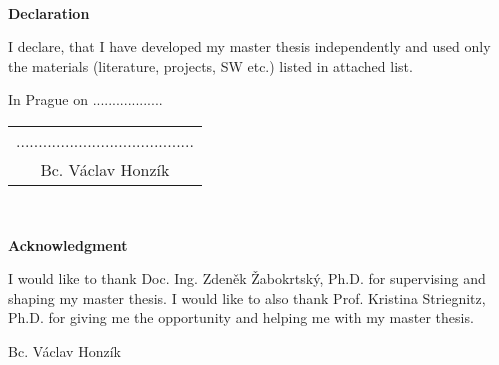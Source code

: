 \documentclass[a4paper,12pt,twoside]{report}
\newcommand{\autor}{Bc. Václav Honzík}           %
\newcommand{\vedouci}{Doc. Ing. Zdeněk Žabokrtský, Ph.D.}         %
\newcommand{\konzultant}{Prof. Kristina Striegnitz, Ph.D.} %
\begin{document}
~ %
\vfill %

{\bf Declaration} %

\vspace{0.5cm} %
I declare, that I have developed my master thesis independently and used only the materials (literature, projects, SW etc.) listed in attached list.

\vspace{5mm}In Prague on ..................\hfill  %
    \begin{tabular}{c}                               %
    ........................................\\       %
    \autor                                           %
    \end{tabular}                                    %



\newpage
\thispagestyle{empty}

~
\vfill %

{\bf Acknowledgment}

\vspace{5mm} %
I would like to thank \vedouci{} for supervising and shaping my master thesis. I would like to also thank \konzultant{} for giving me the opportunity and helping me with my master thesis.

\begin{flushright}
\autor
\end{flushright}  %

\newpage   %
\thispagestyle{empty}   %

\newbox\odstavecbox
\newlength\vyskaodstavce
\newcommand\odstavec[2]{%
    \setbox\odstavecbox=\hbox{%
         \parbox[t]{#1}{#2\vrule width 0pt depth 4pt}}%
    \global\vyskaodstavce=\dp\odstavecbox
    \box\odstavecbox}
\newcommand{\delka}{120mm} %
\end{document}
